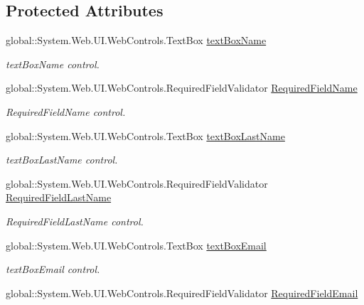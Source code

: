 \subsection*{Protected Attributes}
\begin{DoxyCompactItemize}
\item 
global\+::\+System.\+Web.\+U\+I.\+Web\+Controls.\+Text\+Box \mbox{\hyperlink{classWebApplication_1_1Registro_a3b46f9fd6df72ec564e46e3b924ab40b}{text\+Box\+Name}}
\begin{DoxyCompactList}\small\item\em text\+Box\+Name control. \end{DoxyCompactList}\item 
global\+::\+System.\+Web.\+U\+I.\+Web\+Controls.\+Required\+Field\+Validator \mbox{\hyperlink{classWebApplication_1_1Registro_acf77c4309a5cfd483baffb2dcbfcb83b}{Required\+Field\+Name}}
\begin{DoxyCompactList}\small\item\em Required\+Field\+Name control. \end{DoxyCompactList}\item 
global\+::\+System.\+Web.\+U\+I.\+Web\+Controls.\+Text\+Box \mbox{\hyperlink{classWebApplication_1_1Registro_a8390d910d3bdf14b582533fc931f3cb7}{text\+Box\+Last\+Name}}
\begin{DoxyCompactList}\small\item\em text\+Box\+Last\+Name control. \end{DoxyCompactList}\item 
global\+::\+System.\+Web.\+U\+I.\+Web\+Controls.\+Required\+Field\+Validator \mbox{\hyperlink{classWebApplication_1_1Registro_af350e9c84ba34e57d2a8dfd8dfe42ffa}{Required\+Field\+Last\+Name}}
\begin{DoxyCompactList}\small\item\em Required\+Field\+Last\+Name control. \end{DoxyCompactList}\item 
global\+::\+System.\+Web.\+U\+I.\+Web\+Controls.\+Text\+Box \mbox{\hyperlink{classWebApplication_1_1Registro_a59faaf483b15d3083f8af6d61ff8c41e}{text\+Box\+Email}}
\begin{DoxyCompactList}\small\item\em text\+Box\+Email control. \end{DoxyCompactList}\item 
global\+::\+System.\+Web.\+U\+I.\+Web\+Controls.\+Required\+Field\+Validator \mbox{\hyperlink{classWebApplication_1_1Registro_ae6553f15008ced4083b25fb65ec03307}{Required\+Field\+Email}}

\end{DoxyCompactItemize}
